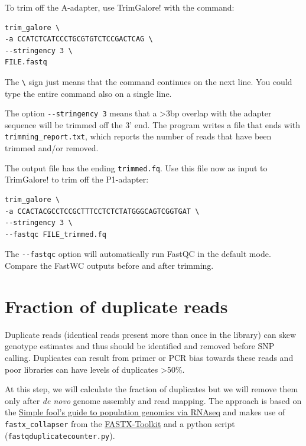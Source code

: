 \documentclass[11pt]{article}
\begin{document}
To trim off the A-adapter, use TrimGalore! with the command:

\begin{verbatim}
trim_galore \
-a CCATCTCATCCCTGCGTGTCTCCGACTCAG \
--stringency 3 \
FILE.fastq
\end{verbatim}

The \texttt{\textbackslash{}} sign just means that the command continues on the next
line. You could type the entire command also on a single line.



The option \texttt{-{}-stringency 3} means that a >3bp overlap with the adapter
sequence will be trimmed off the 3' end. The program writes a file
that ends with \texttt{trimming\_report.txt}, which reports the number of
reads that have been trimmed and/or removed.

The output file has the ending \texttt{trimmed.fq}. Use this file now as
input to TrimGalore! to trim off the P1-adapter:

\begin{verbatim}
trim_galore \
-a CCACTACGCCTCCGCTTTCCTCTCTATGGGCAGTCGGTGAT \
--stringency 3 \
--fastqc FILE_trimmed.fq
\end{verbatim}

The \texttt{-{}-fastqc} option will automatically run FastQC in the default
mode. Compare the FastWC outputs before and after trimming.


\clearpage

\section{Fraction of duplicate reads}
\label{sec-4}
Duplicate reads (identical reads present more than once in the
library) can skew genotype estimates and thus should be identified and
removed before SNP calling. Duplicates can result from primer or PCR
bias towards these reads and poor libraries can have levels of
duplicates >50\%.

At this step, we will calculate the fraction of duplicates but we will
remove them only after \emph{de novo} genome assembly and read mapping.
The approach is based on the \href{http://sfg.stanford.edu/SFG.pdf}{Simple fool's guide to population
genomics via RNAseq} and makes use of \texttt{fastx\_collapser} from the
\href{http://hannonlab.cshl.edu/fastx_toolkit/}{FASTX-Toolkit} and a python script (\texttt{fastqduplicatecounter.py}).
\end{document}

